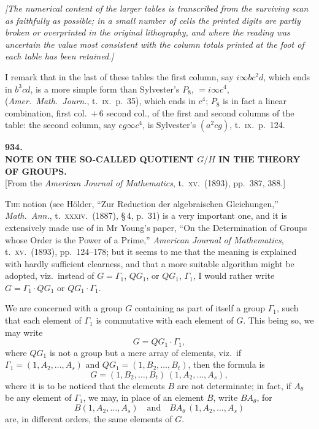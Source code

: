 \documentclass[11pt]{article}
\begin{document}
\medskip
\noindent\textit{[The numerical content of the larger tables is transcribed from the surviving scan as faithfully as possible; in a small number of cells the printed digits are partly broken or overprinted in the original lithography, and where the reading was uncertain the value most consistent with the column totals printed at the foot of each table has been retained.]}

\medskip
I remark that in the last of these tables the first column, say $i \infty b c^2 d$, which ends in $b^3 cd$, is a more simple form than Sylvester's $P_8$, $= i \infty c^4$, (\textit{Amer.\ Math.\ Journ.}, t.\ \textsc{ix}.\ p.\ 35), which ends in $c^4$; $P_8$ is in fact a linear combination, first col.\ $+\,6$ second col., of the first and second columns of the table: the second column, say $eg \infty c^4$, is Sylvester's $(a^2 cg)$, t.\ \textsc{ix}.\ p.\ 124.

\clearpage
\begin{center}
{\large\bfseries 934.}\\[0.5em]
{\large\bfseries NOTE ON THE SO-CALLED QUOTIENT $G/H$ IN THE THEORY OF GROUPS.}\\[0.5em]
{\small [From the \textit{American Journal of Mathematics}, t.\ \textsc{xv}.\ (1893), pp.\ 387, 388.]}
\end{center}
\vspace{0.5em}

\textsc{The} notion (see H\"older, ``Zur Reduction der algebraischen Gleichungen,'' \textit{Math.\ Ann.}, t.\ \textsc{xxxiv}.\ (1887), \S\,4, p.\ 31) is a very important one, and it is extensively made use of in Mr Young's paper, ``On the Determination of Groups whose Order is the Power of a Prime,'' \textit{American Journal of Mathematics}, t.\ \textsc{xv}.\ (1893), pp.\ 124--178; but it seems to me that the meaning is explained with hardly sufficient clearness, and that a more suitable algorithm might be adopted, viz.\ instead of $G = \Gamma_1$, $Q G_1$, or $Q G_1$, $\Gamma_1$, I would rather write $G = \Gamma_1\!\cdot\! Q G_1$ or $Q G_1\!\cdot\!\Gamma_1$.

We are concerned with a group $G$ containing as part of itself a group $\Gamma_1$, such that each element of $\Gamma_1$ is commutative with each element of $G$. This being so, we may write
\[
G = Q G_1\cdot \Gamma_1,
\]
where $Q G_1$ is not a group but a mere array of elements, viz.\ if $\Gamma_1 = (1, A_2, \ldots, A_s)$ and $Q G_1 = (1, B_2, \ldots, B_t)$, then the formula is
\[
G = (1, B_2, \ldots, B_t)\,(1, A_2, \ldots, A_s),
\]
where it is to be noticed that the elements $B$ are not determinate; in fact, if $A_\theta$ be any element of $\Gamma_1$, we may, in place of an element $B$, write $B A_\theta$, for
\[
B(1, A_2, \ldots, A_s)\quad\text{and}\quad B A_\theta\,(1, A_2, \ldots, A_s)
\]
are, in different orders, the same elements of $G$.
\end{document}
